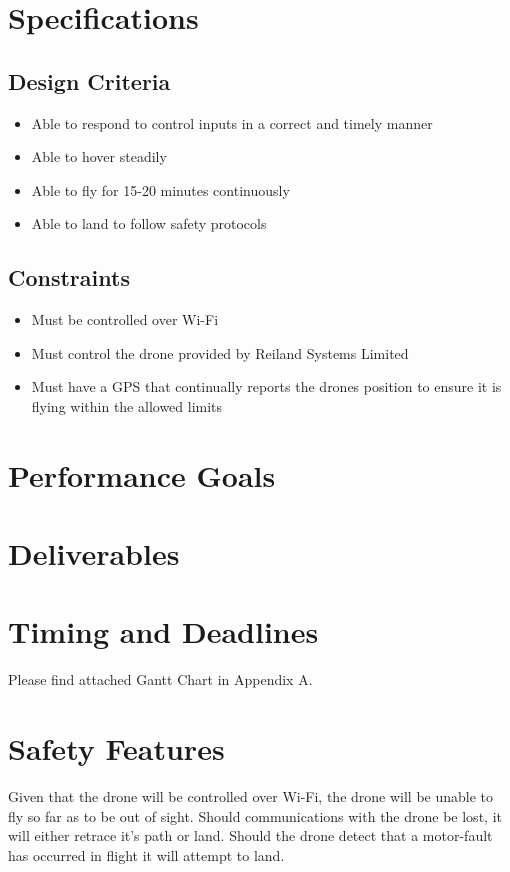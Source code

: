 \documentclass{texMemo}
\begin{document}
\section{Specifications}
\subsection{Design Criteria}
\begin{itemize}
	\item Able to respond to control inputs in a correct and timely manner
	\item Able to hover steadily 
	\item Able to fly for 15-20 minutes continuously
	\item Able to land to follow safety protocols
\end{itemize}
\subsection{Constraints}
\begin{itemize}
	\item Must be controlled over Wi-Fi
	\item Must control the drone provided by Reiland Systems Limited
	\item Must have a GPS that continually reports the drones position to ensure it is flying within the allowed limits
\end{itemize}
\section{Performance Goals}

\section{Deliverables}

\section{Timing and Deadlines}
Please find attached Gantt Chart in Appendix A.
\section{Safety Features}
Given that the drone will be controlled over Wi-Fi, the drone will be unable to fly so far as to be out of sight.  Should communications with the drone be lost, it will either retrace it's path or land.  Should the drone detect that a motor-fault has occurred in flight it will attempt to land.
\end{document}
